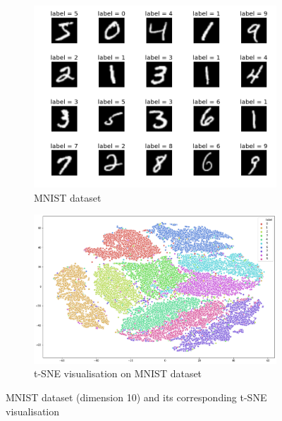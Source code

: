 \begin{enumerate}
\begin{figure}[h]
    \centering
    \begin{subfigure}[b]{0.45\linewidth}
        \centering
        \includegraphics[width=\linewidth]{img/2_mnist.png}
        \caption{MNIST dataset}
    \end{subfigure}
    \hfill %
    \begin{subfigure}[b]{0.45\linewidth}
        \centering
        \includegraphics[width=\linewidth]{img/2_mnist-tsne.png}
        \caption{t-SNE visualisation on MNIST dataset}
        \label{fig:mnist-tsne}
    \end{subfigure}
    \caption{{\footnotesize MNIST dataset (dimension 10) and its corresponding t-SNE visualisation}}
    \label{fig:mnist-tsne}
\end{figure}




\end{enumerate}


